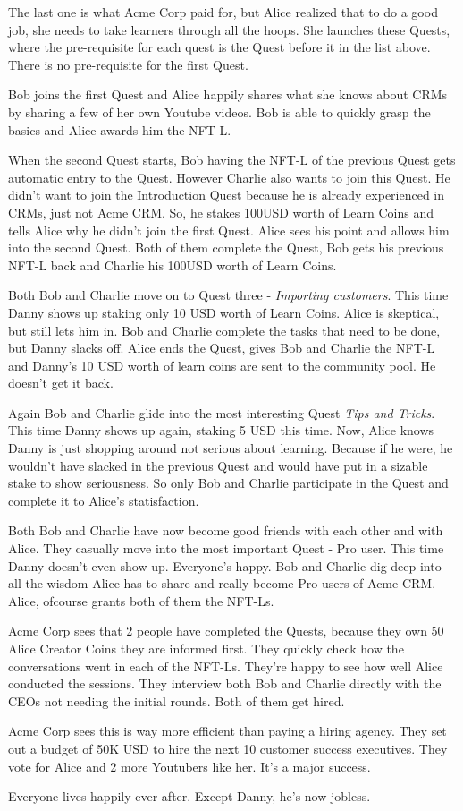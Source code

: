 \documentclass{article}
\begin{document}
    The last one is what Acme Corp paid for, but Alice realized that to do a good job, she needs to take learners through all the hoops. She launches these Quests, where the pre-requisite for each quest is the Quest before it in the list above.
    There is no pre-requisite for the first Quest.
    \par
    Bob joins the first Quest and Alice happily shares what she knows about CRMs by sharing a few of her own Youtube videos. Bob is able to quickly grasp the basics and Alice awards him the NFT-L.
    \par
    When the second Quest starts, Bob having the NFT-L of the previous Quest gets automatic entry to the Quest.
    However Charlie also wants to join this Quest. He didn't want to join the Introduction Quest because he is already experienced in CRMs, just not Acme CRM.
    So, he stakes 100USD worth of Learn Coins and tells Alice why he didn't join the first Quest. Alice sees his point and allows him into the second Quest. 
    Both of them complete the Quest, Bob gets his previous NFT-L back and Charlie his 100USD worth of Learn Coins.
    \par
    Both Bob and Charlie move on to Quest three - \textit{Importing customers}. This time Danny shows up staking only 10 USD worth of Learn Coins. Alice is skeptical, but still lets him in.
    Bob and Charlie complete the tasks that need to be done, but Danny slacks off. Alice ends the Quest, gives Bob and Charlie the NFT-L and Danny's 10 USD worth of learn coins are sent to the community pool. He doesn't get it back. 
    \par
    Again Bob and Charlie glide into the most interesting Quest \textit{Tips and Tricks}. This time Danny shows up again, staking 5 USD this time. 
    Now, Alice knows Danny is just shopping around not serious about learning. Because if he were, he wouldn't have slacked in the previous Quest and would have put in a sizable stake to show seriousness.
    So only Bob and Charlie participate in the Quest and complete it to Alice's statisfaction. 
    \par 
    Both Bob and Charlie have now become good friends with each other and with Alice. They casually move into the most important Quest - Pro user. 
    This time Danny doesn't even show up. Everyone's happy. Bob and Charlie dig deep into all the wisdom Alice has to share and really become Pro users of Acme CRM. Alice, ofcourse grants both of them the NFT-Ls.
    \par
    Acme Corp sees that 2 people have completed the Quests, because they own 50 Alice Creator Coins they are informed first. They quickly check how the conversations went in each of the NFT-Ls. They're happy to see how well Alice conducted the sessions. 
    They interview both Bob and Charlie directly with the CEOs not needing the initial rounds. Both of them get hired.
    \par
    Acme Corp sees this is way more efficient than paying a hiring agency. They set out a budget of 50K USD to hire the next 10 customer success executives. They vote for Alice and 2 more Youtubers like her.
    It's a major success.
    \par
    Everyone lives happily ever after. Except Danny, he's now jobless.

      
        

      
\end{document}
